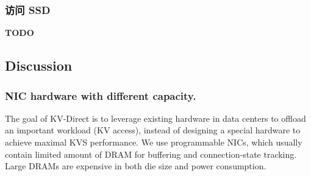\subsubsection{访问 SSD}

\textbf{TODO}



\subsection{Discussion}
\label{kvdirect:sec:discussion}

\subsubsection{NIC hardware with different capacity.}
\label{kvdirect:sec:different-nic}

The goal of KV-Direct is to leverage existing hardware in data centers to offload an important workload (KV access), instead of designing a special hardware to achieve maximal KVS performance. We use programmable NICs, which usually contain limited amount of DRAM for buffering and connection-state tracking. Large DRAMs are expensive in both die size and power consumption.

\begin{table}[t]
\centering
{}
\caption{Optimal load dispatch ratio for long-tail workload under different NIC DRAM/PCIe throughput ratio (vertical) and NIC/host memory size ratio (horizontal).}
\label{kvdirect:tab:optimal-load-dispatch}

\end{table}

